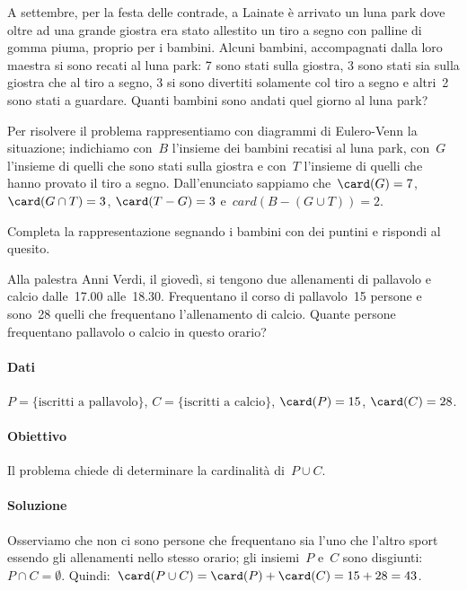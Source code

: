 {\begin{exrig}
\begin{esempio}
 \end{esempio}

 \begin{esempio}
 A settembre, per la festa delle contrade, a Lainate è arrivato un luna
park dove oltre ad una grande giostra era stato allestito un tiro a
segno con palline di gomma piuma, proprio per i bambini. Alcuni
bambini, accompagnati dalla loro maestra si sono recati al luna park: 7
sono stati sulla giostra, 3 sono stati sia sulla giostra che al tiro a
segno, 3 si sono divertiti solamente col tiro a segno e altri~2 sono
stati a guardare. Quanti bambini sono andati quel giorno al luna park?

\begin{multicols}{2}
Per risolvere il problema rappresentiamo con diagrammi di Eulero-Venn la 
situazione; indichiamo con~$B$ l'insieme dei bambini recatisi al luna park, 
con~$G$ l'insieme di quelli che sono stati sulla giostra e con~$T$ l'insieme
di quelli che hanno provato il tiro a segno.
Dall'enunciato sappiamo 
che~$\card(G)=7$, $\card(G\cap T)=3$, $\card(T-G)=3$ e~$card(B-(G\cup T))=2$.
\begin{center}
 
\end{center}
\end{multicols}

Completa la rappresentazione segnando i bambini con dei puntini e rispondi 
al quesito.
\end{esempio}

\begin{esempio}
Alla palestra Anni Verdi, il giovedì, si tengono due allenamenti di pallavolo 
e calcio dalle~17.00 alle~18.30. Frequentano il corso di
pallavolo~15 persone e sono~28 quelli che frequentano l'allenamento di calcio. 
Quante persone frequentano pallavolo o calcio in questo orario?

\paragraph{Dati} $P=\{\text{iscritti a pallavolo}\}$, $C=\{\text{iscritti a 
calcio}\}$, $\card(P)=15$, $\card(C)=28$.

\paragraph{Obiettivo} Il problema chiede di determinare la cardinalità 
di~$P\cup C$.

\paragraph{Soluzione} Osserviamo che non ci sono persone che frequentano sia
l'uno che l'altro sport essendo gli allenamenti nello stesso orario; gli 
insiemi~$P$ e~$C$ sono disgiunti:~$P\cap C=\emptyset $. 
Quindi:~$\card(P\cup C)=\card(P)+\card(C)=15+28=43$.


\end{esempio}
\end{exrig}}
